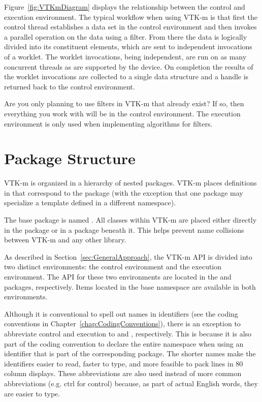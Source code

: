 Figure~\ref{fig:VTKmDiagram} displays the relationship between the control
and execution environment. The typical workflow when using VTK-m is that
first the control thread establishes a data set in the control environment
and then invokes a parallel operation on the data using a filter. From
there the data is logically divided into its constituent elements, which
are sent to independent invocations of a worklet. The worklet
invocations, being independent, are run on as many concurrent threads as
are supported by the device. On completion the results of the worklet
invocations are collected to a single data structure and a handle is
returned back to the control environment.

\begin{didyouknow}
  Are you only planning to use filters in VTK-m that already exist? If so,
  then everything you work with will be in the control environment. The
  execution environment is only used when implementing algorithms for
  filters.
\end{didyouknow}


\section{Package Structure}
\label{sec:PackageStructure}


VTK-m is organized in a hierarchy of nested packages. VTK-m places
definitions in   that correspond to
the package (with the exception that one package may specialize a template
defined in a different namespace).

The base package is named \vtkm{}. All classes within VTK-m are placed
either directly in the \vtkm{} package or in a package beneath it. This
helps prevent name collisions between VTK-m and any other library.

As described in Section~\ref{sec:GeneralApproach}, the VTK-m API is divided
into two distinct environments:  the control environment
  and the execution
environment.  
The API for these two environments are located in the \vtkmcont{} and
\vtkmexec{} packages, respectively. Items located in the base \vtkm{}
namespace are available in both environments.

Although it is conventional to spell out names in identifiers (see the
coding conventions in Chapter~\ref{chap:CodingConventions}), there is an
exception to abbreviate control and execution to 
and , respectively. This is because it is also part of
the coding convention to declare the entire namespace when using an
identifier that is part of the corresponding package. The shorter names
make the identifiers easier to read, faster to type, and more feasible to
pack lines in 80 column displays. These abbreviations are also used instead
of more common abbreviations (e.g. ctrl for control) because, as part of
actual English words, they are easier to type.


